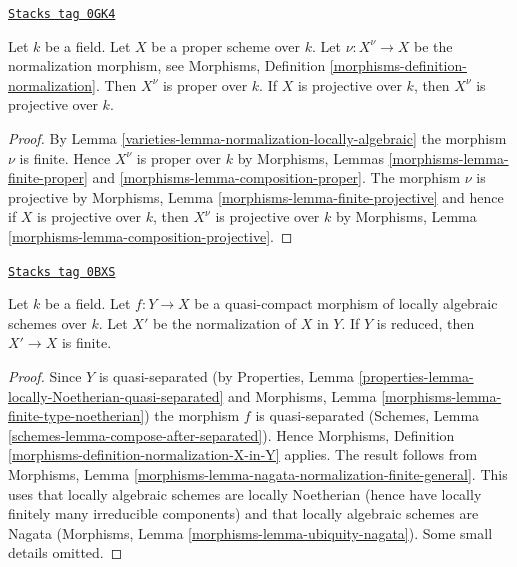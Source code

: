 \begin{lemma}
\label{varieties-lemma-normalize-projective}
\href{https://stacks.math.columbia.edu/tag/0GK4}{\texttt{Stacks tag 0GK4}}

Let $k$ be a field. Let $X$ be a proper scheme over $k$.
Let $\nu : X^\nu \to X$ be the normalization morphism, see
Morphisms, Definition \ref{morphisms-definition-normalization}.
Then $X^\nu$ is proper over $k$. If $X$ is projective over $k$,
then $X^\nu$ is projective over $k$.
\end{lemma}

\begin{proof}

By Lemma \ref{varieties-lemma-normalization-locally-algebraic} the morphism $\nu$
is finite. Hence $X^\nu$ is proper over $k$ by
Morphisms, Lemmas \ref{morphisms-lemma-finite-proper} and
\ref{morphisms-lemma-composition-proper}.
The morphism $\nu$ is projective by
Morphisms, Lemma \ref{morphisms-lemma-finite-projective}
and hence if $X$ is projective over $k$, then $X^\nu$ is projective over $k$
by Morphisms, Lemma \ref{morphisms-lemma-composition-projective}.
\end{proof}

\begin{lemma}
\label{varieties-lemma-relative-normalization-finite}
\href{https://stacks.math.columbia.edu/tag/0BXS}{\texttt{Stacks tag 0BXS}}

Let $k$ be a field. Let $f : Y \to X$ be a quasi-compact
morphism of locally algebraic schemes over $k$. Let $X'$
be the normalization of $X$ in $Y$. If $Y$ is reduced, then
$X' \to X$ is finite.
\end{lemma}

\begin{proof}
Since $Y$ is quasi-separated (by
Properties, Lemma \ref{properties-lemma-locally-Noetherian-quasi-separated} and
Morphisms, Lemma \ref{morphisms-lemma-finite-type-noetherian})
the morphism $f$ is quasi-separated
(Schemes, Lemma \ref{schemes-lemma-compose-after-separated}).
Hence Morphisms, Definition \ref{morphisms-definition-normalization-X-in-Y}
applies. The result follows from Morphisms, Lemma
\ref{morphisms-lemma-nagata-normalization-finite-general}.
This uses that locally algebraic schemes are locally Noetherian
(hence have locally finitely many irreducible components)
and that locally algebraic schemes are Nagata
(Morphisms, Lemma \ref{morphisms-lemma-ubiquity-nagata}).
Some small details omitted.
\end{proof}


